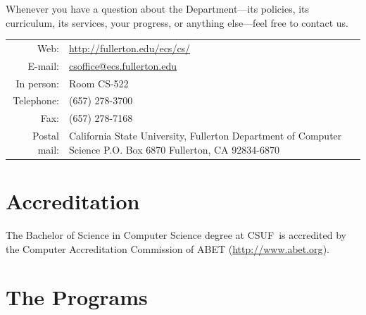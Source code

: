 \documentclass{book}
\newcommand{\campusname}{CSUF}
\begin{document}
Whenever you have a question about the Department---its policies, its curriculum, its services, your progress, or anything else---feel free to contact us.

\begin{tabular}{r p{6in}} %
  Web: & \url{http://fullerton.edu/ecs/cs/} \\ \index{website}
  E-mail: & \href{mailto:csoffice@ecs.fullerton.edu}{csoffice@ecs.fullerton.edu} \\ \index{e-mail}
  In person: & Room CS-522 \\ \index{department office}
  Telephone: & (657) 278-3700 \\ \index{phone number} \index{telephone number}
  Fax: & (657) 278-7168 \\ \index{fax number}
  Postal mail: & California State University, Fullerton \newline\index{postal address}\index{address}Department of Computer Science \newline
P.O. Box 6870 \newline
Fullerton, CA 92834-6870
\end{tabular}

\section{Accreditation} 

The Bachelor of Science in Computer Science degree at \campusname~is accredited by the Computer Accreditation Commission of ABET (\url{http://www.abet.org}).

\begin{center}
\end{center}

\section{The Programs}
\end{document}
